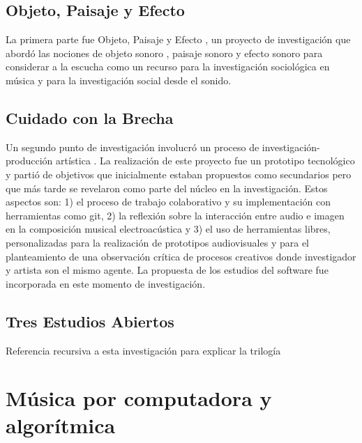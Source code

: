 \subsection{Objeto, Paisaje y Efecto}

La primera parte fue Objeto, Paisaje y Efecto \citep{ocelotlLic}, un proyecto de investigación que abordó las nociones de objeto sonoro \citep{schaeffer}, paisaje sonoro\citep{schafer1} y efecto sonoro \citep{augoyard} para considerar a la escucha como un recurso para la investigación sociológica en música y para la investigación social desde el sonido.

\subsection{Cuidado con la Brecha}

Un segundo punto de investigación involucró un proceso de investigación-producción artística \citep{ocelotlMas}. La realización de este proyecto fue un prototipo tecnológico y partió de objetivos que inicialmente estaban propuestos como secundarios pero que más tarde se revelaron como parte del núcleo en la investigación. Estos aspectos son: 1) el proceso de trabajo colaborativo y su implementación con herramientas como git, 2) la reflexión sobre la interacción entre audio e imagen en la composición musical electroacústica y 3) el uso de herramientas libres, personalizadas para la realización de prototipos audiovisuales y para el planteamiento de una observación crítica de procesos creativos donde investigador y artista son el mismo agente. La propuesta de los estudios del software fue incorporada en este momento de investigación. 

\subsection{Tres Estudios Abiertos}

Referencia recursiva a esta investigación para explicar la trilogía

\section{Música por computadora y algorítmica}


